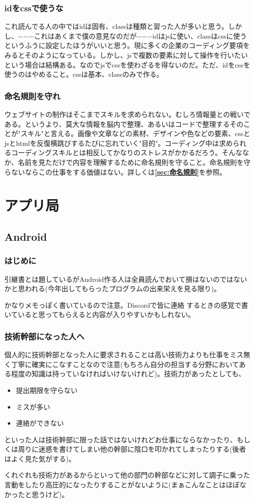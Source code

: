 \documentclass[dvipdfmx,jb5]{jarticle}
\begin{document}
\subsubsection{idをcssで使うな}
これ読んでる人の中ではidは固有、classは種類と習った人が多いと思う。しかし、−−−これはあくまで僕の意見なのだが−−−idはjsに使い、classはcssに使うというふうに設定したほうがいいと思う。現に多くの企業のコーディング要項をみるとそのようになっている。しかし、jsで複数の要素に対して操作を行いたいという場合は結構ある。なのでjsでcssを使わざるを得ないのだ。ただ、idをcssを使うのはやめること。cssは基本、classのみで作る。

\subsubsection{命名規則を守れ}
ウェブサイトの制作はそこまでスキルを求められない。むしろ情報量との戦いである。というより、莫大な情報を脳内で整理、あるいはコードで整理するそのことが"スキル"と言える。画像や文章などの素材、デザインや色などの要素、cssとjsとhtmlを反復横跳びするたびに忘れていく"目的"。コーディング中は求められるコーディングスキルとは相反してかなりのストレスがかかるだろう。そんななか、名前を見ただけで内容を理解するために命名規則を守ること。命名規則を守らないならこの仕事をする価値はない。詳しくは{\bf\ref{sec:命名規則}}を参照。

 \newpage
 \section{アプリ局}
 \subsection{Android}
 \subsubsection{はじめに}
 引継書とは題しているがAndroid作る人は全員読んでおいて損はないのではないかと思われる(今年出してもらったプログラムの出来栄えを見る限り)。\par
かなりメモっぽく書いているので注意。Discordで皆に連絡
するときの感覚で書いていると思ってもらえると内容が入りやすいかもしれない。
 \subsubsection{技術幹部になった人へ}
 個人的に技術幹部となった人に要求されることは高い技術力よりも仕事をミス無く丁寧に確実にこなすことなので注意(もちろん自分の担当する分野においてある程度の知識は持っていなければいけないけれど)。技術力があったとしても、
 \begin{itemize}
 \item 提出期限を守らない
 \item ミスが多い
 \item 連絡ができない
 \end{itemize}
 といった人は技術幹部に限った話ではないけれどお仕事にならなかったり、もしくは周りに迷惑を書けてしまい他の幹部に陰口を叩かれてしまったりする(後者はよく見た気がする)。\par
くれぐれも技術力があるからといって他の部門の幹部などに対して調子に乗った言動をしたり高圧的になったりすることがないように(まぁこんなことはほぼなかったと思うけど)。
\end{document}
